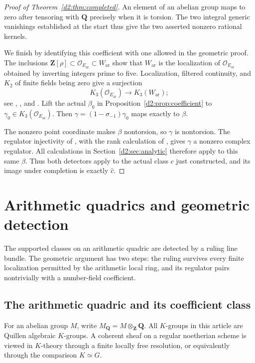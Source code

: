\documentclass[11pt,a4paper]{amsart}
\numberwithin{equation}{section}
\theoremstyle{definition}
\theoremstyle{remark}
\newcommand{\Q}{\mathbf Q}
\newcommand{\Z}{\mathbf Z}
\newcommand{\Qrat}{_{\Q}}
\newcommand{\DtwoZZ}{\mathbf{Z}}
\newcommand{\DtwoQQ}{\mathbf{Q}}
\newcommand{\DtwocO}{\mathcal O}
\newcommand{\Dtwowh}{\widehat}
\newcommand{\Dtwoar}{\mathrm{ar}}
\begin{document}
\begin{proof}[Proof of Theorem~\ref{d2:thm:completed}]
An element of an abelian group maps to zero after tensoring with
\(\DtwoQQ\) precisely when it is torsion.
The two integral generic vanishings established at the start thus
give the two asserted nonzero rational kernels.

We finish by identifying this coefficient with one allowed in the
geometric proof. The inclusions
\(\DtwoZZ[\rho]\subset\DtwocO_{E_{\Dtwoar}}\subset W_{\Dtwoar}\) show that
\(W_{\Dtwoar}\) is the localization of \(\DtwocO_{E_{\Dtwoar}}\) obtained by
inverting integers prime to five.
Localization, filtered continuity, and
\(K_2\) of finite fields being zero give a surjection
\[
 K_3(\DtwocO_{E_{\Dtwoar}})\longrightarrow K_3(W_{\Dtwoar});
\]
see \cite[V.6.1]{Weibel},
\cite[IV, Section~6.4]{Weibel}, and
\cite{QuillenFinite}\cite[IV, Corollary~1.13]{Weibel}.
Lift the actual \(\beta_0\) in
Proposition~\ref{d2:prop:coefficient} to
\(\gamma_0\in K_3(\DtwocO_{E_{\Dtwoar}})\).
Then \(\gamma=(1-\sigma_{-1})\gamma_0\) maps exactly to \(\beta\).

The nonzero point coordinate makes \(\beta\) nontorsion, so
\(\gamma\) is nontorsion.
The regulator injectivity of
\cite[Section~6]{BunkeTamme}, with the rank calculation of
\cite[Proposition~12.2]{Borel}, gives \(\gamma\) a nonzero
complex regulator.
All calculations in Section~\ref{d2:sec:analytic} therefore apply to
this same \(\beta\).
Thus both detectors apply to the actual class \(c\) just constructed,
and its image under completion is exactly \(\Dtwowh c\).
\end{proof}



\section{Arithmetic quadrics and geometric detection}\label{d3:sec:geometry}
The supported classes on an arithmetic quadric are detected by a ruling
line bundle. The geometric argument has two steps: the ruling survives
every finite localization permitted by the arithmetic local ring, and
its regulator pairs nontrivially with a number-field coefficient.

\subsection{The arithmetic quadric and its coefficient class}

For an abelian group $M$, write $M\Qrat=M\otimes_{\Z}\Q$. All $K$-groups in this article are Quillen algebraic $K$-groups. A coherent sheaf on a regular noetherian scheme is viewed in $K$-theory through a finite locally free resolution, or equivalently through the comparison $K\simeq G$.
\end{document}
